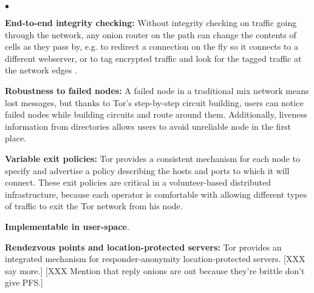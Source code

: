 \documentclass[times,10pt,twocolumn]{article}
\newenvironment{tightlist}{\begin{list}{$\bullet$}{
  \setlength{\itemsep}{0mm}
    \setlength{\parsep}{0mm}
    }}{\end{list}}
\begin{document}
\begin{tightlist}
\item \textbf{End-to-end integrity checking:} Without integrity checking
on traffic going through the network, any onion router on the path
can change the contents of cells as they pass by, e.g. to redirect a
connection on the fly so it connects to a different webserver, or to
tag encrypted traffic and look for the tagged traffic at the network
edges \cite{minion-design}.

\item \textbf{Robustness to failed nodes:} A failed node in a traditional
mix network means lost messages, but thanks to Tor's step-by-step
circuit building, users can notice failed
nodes while building circuits and route around them.  Additionally,
liveness information from directories allows users to avoid
unreliable node in the first place.
%

\item \textbf{Variable exit policies:} Tor provides a consistent
mechanism  for
each node to specify and advertise a policy describing the hosts and
ports to which it will connect. These exit policies
are critical in a volunteer-based distributed infrastructure, because
each operator is comfortable with allowing different types of traffic
to exit the Tor network from his node.

\item \textbf{Implementable in user-space}.

\item \textbf{Rendezvous points and location-protected servers:} Tor
provides an integrated mechanism for responder-anonymity
location-protected servers.  [XXX say more.]
[XXX Mention that reply onions are out because they're brittle don't give PFS.]

\end{tightlist}
\end{document}

